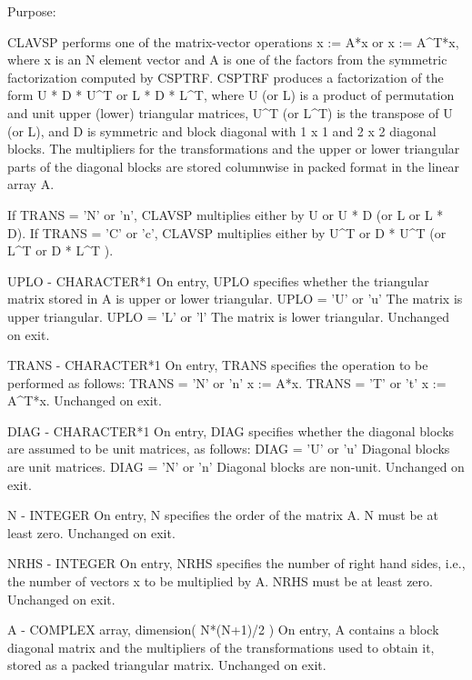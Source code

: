 \begin{DoxyParagraph}{Purpose\+: }
\begin{DoxyVerb}    CLAVSP  performs one of the matrix-vector operations
       x := A*x  or  x := A^T*x,
    where x is an N element vector and  A is one of the factors
    from the symmetric factorization computed by CSPTRF.
    CSPTRF produces a factorization of the form
         U * D * U^T     or     L * D * L^T,
    where U (or L) is a product of permutation and unit upper (lower)
    triangular matrices, U^T (or L^T) is the transpose of
    U (or L), and D is symmetric and block diagonal with 1 x 1 and
    2 x 2 diagonal blocks.  The multipliers for the transformations
    and the upper or lower triangular parts of the diagonal blocks
    are stored columnwise in packed format in the linear array A.

    If TRANS = 'N' or 'n', CLAVSP multiplies either by U or U * D
    (or L or L * D).
    If TRANS = 'C' or 'c', CLAVSP multiplies either by U^T or D * U^T
    (or L^T or D * L^T ).\end{DoxyVerb}
 \begin{DoxyVerb}  UPLO   - CHARACTER*1
           On entry, UPLO specifies whether the triangular matrix
           stored in A is upper or lower triangular.
              UPLO = 'U' or 'u'   The matrix is upper triangular.
              UPLO = 'L' or 'l'   The matrix is lower triangular.
           Unchanged on exit.

  TRANS  - CHARACTER*1
           On entry, TRANS specifies the operation to be performed as
           follows:
              TRANS = 'N' or 'n'   x := A*x.
              TRANS = 'T' or 't'   x := A^T*x.
           Unchanged on exit.

  DIAG   - CHARACTER*1
           On entry, DIAG specifies whether the diagonal blocks are
           assumed to be unit matrices, as follows:
              DIAG = 'U' or 'u'   Diagonal blocks are unit matrices.
              DIAG = 'N' or 'n'   Diagonal blocks are non-unit.
           Unchanged on exit.

  N      - INTEGER
           On entry, N specifies the order of the matrix A.
           N must be at least zero.
           Unchanged on exit.

  NRHS   - INTEGER
           On entry, NRHS specifies the number of right hand sides,
           i.e., the number of vectors x to be multiplied by A.
           NRHS must be at least zero.
           Unchanged on exit.

  A      - COMPLEX array, dimension( N*(N+1)/2 )
           On entry, A contains a block diagonal matrix and the
           multipliers of the transformations used to obtain it,
           stored as a packed triangular matrix.
           Unchanged on exit.


\end{DoxyVerb}
\end{DoxyParagraph}
